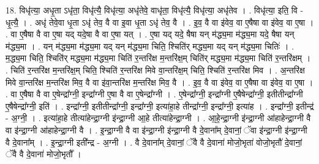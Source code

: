 \documentclass[17pt]{extarticle}
\begin{document}
18. विधृ॑त्या॒ अधृ॒ता ऽधृ॑ता॒ विधृ॑त्यै॒ विधृ॑त्या॒ अधृ॑तेवे॒ वाधृ॑ता॒ विधृ॑त्यै॒ विधृ॑त्या॒ अधृ॑तेव । . विधृ॑त्या॒ इति॒ वि - धृ॒त्यै॒ । . अधृ॑ तेवे॒वा धृ॒ता ऽधृ॑ तेव॒ वै वा इ॒वा धृ॒ता ऽधृ॑ तेव॒ वै । . इ॒व॒ वै वा इ॑वेव॒ वा ए॒षैषा वा इ॑वेव॒ वा ए॒षा । . वा ए॒षैषा वै वा ए॒षा यद् यदे॒षा वै वा ए॒षा यत् । . ए॒षा यद् यदे॒ षैषा यन् म॑द्ध्य॒मा म॑द्ध्य॒मा यदे॒ षैषा यन् म॑द्ध्य॒मा । . यन् म॑द्ध्य॒मा म॑द्ध्य॒मा यद् यन् म॑द्ध्य॒मा चिति॒ श्चिति॑र् मद्ध्य॒मा यद् यन् म॑द्ध्य॒मा चितिः॑ । . म॒द्ध्य॒मा चिति॒ श्चिति॑र् मद्ध्य॒मा म॑द्ध्य॒मा चिति॑ र॒न्तरि॑क्ष म॒न्तरि॑क्ष॒म् चिति॑र् मद्ध्य॒मा म॑द्ध्य॒मा चिति॑ र॒न्तरि॑क्षम् । . चिति॑ र॒न्तरि॑क्ष म॒न्तरि॑क्ष॒म् चिति॒ श्चिति॑ र॒न्तरि॑क्ष मिवे वा॒न्तरि॑क्ष॒म् चिति॒ श्चिति॑ र॒न्तरि॑क्ष मिव । . अ॒न्तरि॑क्ष मिवे वा॒न्तरि॑क्ष म॒न्तरि॑क्ष मिव॒ वै वा इ॑वा॒न्तरि॑क्ष म॒न्तरि॑क्ष मिव॒ वै । . इ॒व॒ वै वा इ॑वेव॒ वा ए॒षैषा वा इ॑वेव॒ वा ए॒षा । . वा ए॒षैषा वै वा ए॒षेन्द्रा᳚ग्नी॒ इन्द्रा᳚ग्नी ए॒षा वै वा ए॒षेन्द्रा᳚ग्नी । . ए॒षेन्द्रा᳚ग्नी॒ इन्द्रा᳚ग्नी ए॒षैषेन्द्रा᳚ग्नी॒ इतीतीन्द्रा᳚ग्नी ए॒षैषेन्द्रा᳚ग्नी॒ इति॑ । . इन्द्रा᳚ग्नी॒ इतीतीन्द्रा᳚ग्नी॒ इन्द्रा᳚ग्नी॒ इत्या॑हा॒हे तीन्द्रा᳚ग्नी॒ इन्द्रा᳚ग्नी॒ इत्या॑ह । . इन्द्रा᳚ग्नी॒ इतीन्द्र॑ - अ॒ग्नी॒ । . इत्या॑हा॒हे तीत्या॑हेन्द्रा॒ग्नी इ॑न्द्रा॒ग्नी आ॒हे तीत्या॑हेन्द्रा॒ग्नी । . आ॒हे॒न्द्रा॒ग्नी इ॑न्द्रा॒ग्नी आ॑हाहेन्द्रा॒ग्नी वै वा इ॑न्द्रा॒ग्नी आ॑हाहेन्द्रा॒ग्नी वै । . इ॒न्द्रा॒ग्नी वै वा इ॑न्द्रा॒ग्नी इ॑न्द्रा॒ग्नी वै दे॒वाना᳚म् दे॒वानां॒ ॅवा इ॑न्द्रा॒ग्नी इ॑न्द्रा॒ग्नी वै दे॒वाना᳚म् । . इ॒न्द्रा॒ग्नी इती᳚न्द्र - अ॒ग्नी । . वै दे॒वाना᳚म् दे॒वानां॒ ॅवै वै दे॒वाना॑ मोजो॒भृता॑ वोजो॒भृतौ॑ दे॒वानां॒ ॅवै वै दे॒वाना॑ मोजो॒भृतौ᳚ । \newline
\end{document}
